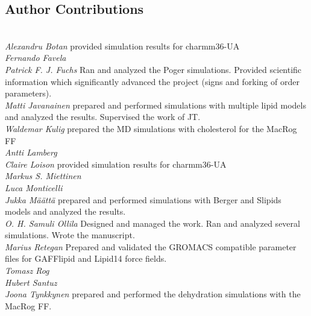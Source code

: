 \documentclass[journal=jacsat,manuscript=article]{achemso}
\begin{document}
\subsection{Author Contributions}
 \\
{\it Alexandru Botan} provided simulation results for charmm36-UA\\
{\it Fernando Favela}  \\
{\it Patrick F. J. Fuchs} Ran and analyzed the Poger simulations. Provided scientific information which significantly advanced the project (signs and forking of order parameters). \\
{\it Matti Javanainen} prepared and performed simulations with multiple lipid models and analyzed the results. Supervised the work of JT.\\
{\it Waldemar Kulig} prepared the MD simulations with cholesterol for the MacRog FF \\
{\it Antti Lamberg}  \\
{\it Claire Loison} provided simulation results for charmm36-UA \\
{\it Markus S. Miettinen}  \\
{\it Luca Monticelli}  \\
{\it Jukka M{\"a}{\"a}tt{\"a}}  prepared and performed simulations with Berger and Slipids models and analyzed the results.\\
{\it O. H. Samuli Ollila} Designed and managed the work. Ran and analyzed several simulations. Wrote the manuscript.  \\
{\it Marius Retegan} Prepared and validated the GROMACS compatible parameter files for GAFFlipid and Lipid14 force fields.\\
{\it Tomasz Rog}  \\
{\it Hubert Santuz}  \\
{\it Joona Tynkkynen} prepared and performed the dehydration simulations with the MacRog FF.\\




\end{document}
